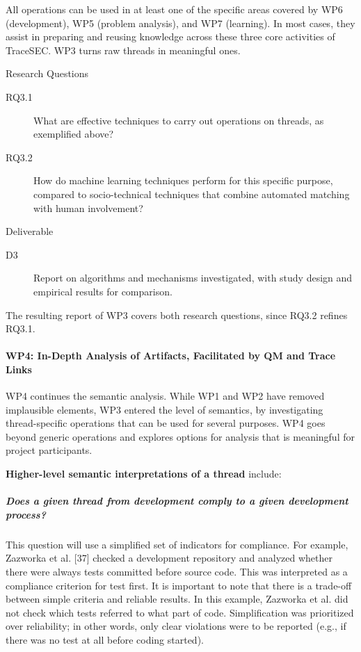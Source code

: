 All operations can be used in at least one of the specific areas covered by WP6 (development), WP5 (problem analysis), and WP7 (learning). In most cases, they assist in preparing and reusing knowledge across these three core activities of TraceSEC. WP3 turns raw threads in meaningful ones.

Research Questions
\begin{description}
	\item[RQ3.1]	What are effective techniques to carry out operations on threads, as exemplified above?
	\item[RQ3.2]	How do machine learning techniques perform for this specific purpose, compared to socio-technical techniques that combine automated matching with human involvement?
\end{description}

Deliverable
\begin{description}
	\item[D3] Report on algorithms and mechanisms investigated, with study design and empirical results for comparison. 
\end{description}

The resulting report of WP3 covers both research questions, since RQ3.2 refines RQ3.1. 

\paragraph*{WP4: In-Depth Analysis of Artifacts, Facilitated by QM and Trace Links}
WP4 continues the semantic analysis. While WP1 and WP2 have removed implausible elements, WP3 entered the level of semantics, by investigating thread-specific operations that can be used for several purposes. WP4 goes beyond generic operations and explores options for analysis that is meaningful for project participants.

\textbf{Higher-level semantic interpretations of a thread} include:

\subparagraph*{Does a given thread from development comply to a given development process?} This question will use a simplified set of indicators for compliance. For example, Zazworka et al. [37] checked a development repository and analyzed whether there were always tests committed before source code. This was interpreted as a compliance criterion for test first. It is important to note that there is a trade-off between simple criteria and reliable results. In this example, Zazworka et al. did not check which tests referred to what part of code. Simplification was prioritized over reliability; in other words, only clear violations were to be reported (e.g., if there was no test at all before coding started).

